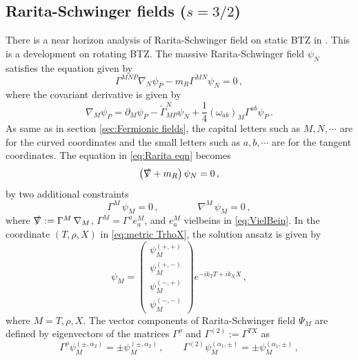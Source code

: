 \documentclass[11pt,a4paper]{article}
\begin{document}
\subsection{Rarita-Schwinger fields ($s=3/2$)}\label{subsec:Rarita-Schwinger fields}
There is a near horizon analysis of Rarita-Schwinger field on static BTZ in \cite{Ceplak:2021efc}. This is a development on rotating BTZ. The massive Rarita-Schwinger field $\psi_N$ satisfies the equation given by
\begin{equation}\label{eq:Rarita eqn}
    \Gamma^{MNP} \nabla_N \psi_P - m_R \Gamma^{MN} \psi_N =0\,,
\end{equation}
where the covariant derivative is given by
\begin{equation}
    \nabla_M \psi_P = \partial_M \psi_P - \tilde{\Gamma}^N_{MP}\psi_N + \frac{1}{4} (\omega_{ab})_M \Gamma^{ab} \psi_P\,.
\end{equation}
As same as in section \ref{sec:Fermionic fields}, the capital letters such as $M, N, \cdots$ are for the curved coordinates and  the small letters such as $a, b, \cdots$ are for the tangent coordinates. The equation in \eqref{eq:Rarita eqn} becomes
\begin{align}\label{eq:Rarita eqn 2}
\left(\slashed \nabla + m_R\right) \psi_N = 0\,,
\end{align}
by two additional constraints
\begin{equation} \label{eq:Rarita const a}
\Gamma^M\, \psi_M =0\,, \qquad \qquad
\nabla^M \, \psi_M  = 0\,,
\end{equation}
where $\slashed \nabla := \Gamma^{M} \, \nabla_M$, $\Gamma^M=\Gamma^a e^M_a$, and $e^M_a$ vielbeins in \eqref{eq:VielBein}. In the coordinate $(T,\rho,X)$ in \eqref{eq:metric TrhoX}, the solution ansatz is given by
\begin{equation}
    \psi_M=\begin{pmatrix}
    \psi_M^{(+,+)} \\
    \psi_M^{(+,-)} \\
    \psi_M^{(-,+)} \\
    \psi_M^{(-,-)}
    \end{pmatrix}
    e^{-i k_T T + i k_X X} \,,
\end{equation}
where $M=T,\rho,X$. The vector components of Rarita-Schwinger field $\Psi_{M}$ are defined by eigenvectors of the matrices $\Gamma^{\underline{\rho}}$ and $\Gamma^{(2)}:=\Gamma^{\underline{TX}}$ as
\begin{equation}
    \Gamma^{\underline{\rho}}\psi_M^{(\pm,\alpha_2)}=\pm \psi_M^{(\pm,\alpha_2)}\,, \qquad 
    \Gamma^{(2)}\psi_M^{(\alpha_1,\pm)}=\pm \psi_M^{(\alpha_1,\pm)}\,,
\end{equation}
\end{document}
